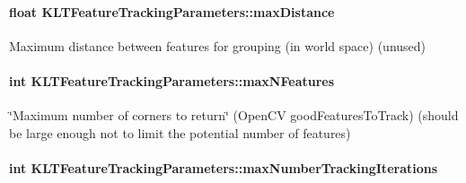 \hypertarget{structKLTFeatureTrackingParameters_aa4870c94cfe88eb27b0b7bb75f6fed23}{
\paragraph[{max\-Distance}]{\setlength{\rightskip}{0pt plus 5cm}float K\-L\-T\-Feature\-Tracking\-Parameters\-::max\-Distance}}\label{structKLTFeatureTrackingParameters_aa4870c94cfe88eb27b0b7bb75f6fed23}


Maximum distance between features for grouping (in world space) (unused) 

\hypertarget{structKLTFeatureTrackingParameters_a89edeff35aebc548921ea9b6a3501c53}{
\paragraph[{max\-N\-Features}]{\setlength{\rightskip}{0pt plus 5cm}int K\-L\-T\-Feature\-Tracking\-Parameters\-::max\-N\-Features}}\label{structKLTFeatureTrackingParameters_a89edeff35aebc548921ea9b6a3501c53}


\char`\"{}\-Maximum number of corners to return\char`\"{} (Open\-C\-V good\-Features\-To\-Track) (should be large enough not to limit the potential number of features) 

\hypertarget{structKLTFeatureTrackingParameters_a491f9f95b04854f413e2a262d32c0ae3}{
\paragraph[{max\-Number\-Tracking\-Iterations}]{\setlength{\rightskip}{0pt plus 5cm}int K\-L\-T\-Feature\-Tracking\-Parameters\-::max\-Number\-Tracking\-Iterations}}\label{structKLTFeatureTrackingParameters_a491f9f95b04854f413e2a262d32c0ae3}


